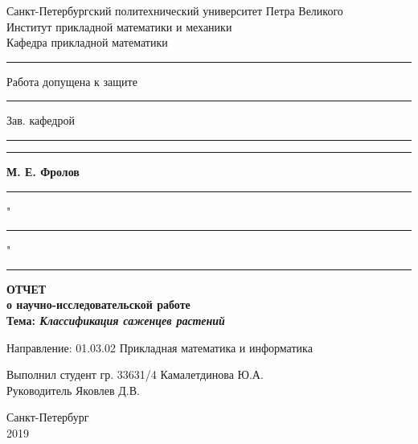 \begin{titlepage}

\begin{center}
Санкт-Петербургский политехнический университет Петра Великого\\
Институт прикладной математики и механики\\
Кафедра прикладной математики\\
\hrulefill
\end{center}

\begin{flushleft}
\rule{9cm}{0pt} {Работа допущена к защите}\\
\rule{9cm}{0pt} Зав. кафедрой\\
\rule{9cm}{0pt} \rule{2.5cm}{0.5pt} {\bfseries{М. Е. Фролов }}\\
\rule{9cm}{0pt} "\rule{.9cm}{0.5pt}" \rule{4cm}{0.5pt}
\end{flushleft}

\vspace{1.5cm}

\begin{center}
{\large {\bfseries ОТЧЕТ\\
о научно-исследовательской работе}}\\

\bigskip \bfseries{Тема:} {\bfseries \emph{Классификация саженцев растений}}
\end{center}

\vspace{1.cm}

\begin{flushleft}
Направление: 01.03.02 Прикладная математика и информатика

\vspace{1.cm}

Выполнил студент гр. 33631/4 \hfill{Камалетдинова Ю.А.} \\ 

\vspace{0.2cm} Руководитель \hfill{Яковлев Д.В.}

\end{flushleft}

\vspace{1.5cm}

\begin{center}
Санкт-Петербург\\
2019
\end{center}

\end{titlepage}
